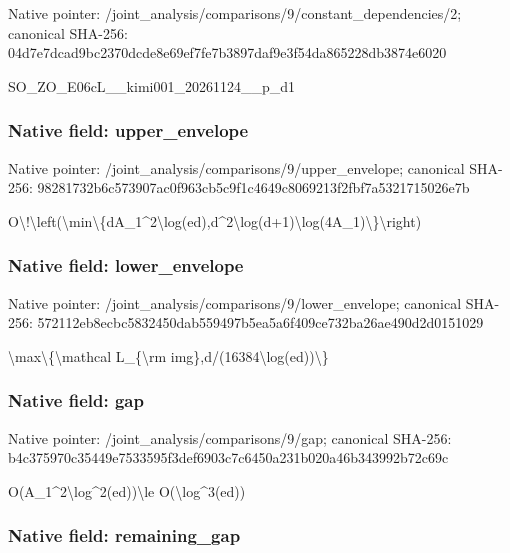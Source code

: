 \documentclass[10pt,a4paper]{article}
\begin{document}
Native pointer: /joint\_analysis/comparis\allowbreak{}ons/9/constant\_dependenc\allowbreak{}ies/2; canonical SHA-256: 04d7e7dcad9bc2370dcde8e6\allowbreak{}9ef7fe7b3897daf9e3f54da8\allowbreak{}65228db3874e6020


SO\_ZO\_E06cL\_\_kimi001\_20261124\_\_p\_d1


\subsubsection{Native field: upper\_envelope}


Native pointer: /joint\_analysis/comparis\allowbreak{}ons/9/upper\_envelope; canonical SHA-256: 98281732b6c573907ac0f963\allowbreak{}cb5c9f1c4649c8069213f2fb\allowbreak{}f7a5321715026e7b


O\textbackslash{}!\textbackslash{}left(\textbackslash{}min\textbackslash{}\{dA\_1\textasciicircum{}2\textbackslash{}lo\allowbreak{}g(ed),d\textasciicircum{}2\textbackslash{}log(d+1)\textbackslash{}log(4\allowbreak{}A\_1)\textbackslash{}\}\textbackslash{}right)


\subsubsection{Native field: lower\_envelope}


Native pointer: /joint\_analysis/comparis\allowbreak{}ons/9/lower\_envelope; canonical SHA-256: 572112eb8ecbc5832450dab5\allowbreak{}59497b5ea5a6f409ce732ba2\allowbreak{}6ae490d2d0151029


\textbackslash{}max\textbackslash{}\{\textbackslash{}mathcal L\_\{\textbackslash{}rm img\},d/(16384\textbackslash{}log(ed))\textbackslash{}\}


\subsubsection{Native field: gap}


Native pointer: /joint\_analysis/comparisons/9/gap; canonical SHA-256: b4c375970c35449e7533595f\allowbreak{}3def6903c7c6450a231b020a\allowbreak{}46b343992b72c69c


O(A\_1\textasciicircum{}2\textbackslash{}log\textasciicircum{}2(ed))\textbackslash{}le O(\textbackslash{}log\textasciicircum{}3(ed))


\subsubsection{Native field: remaining\_gap}
\end{document}
